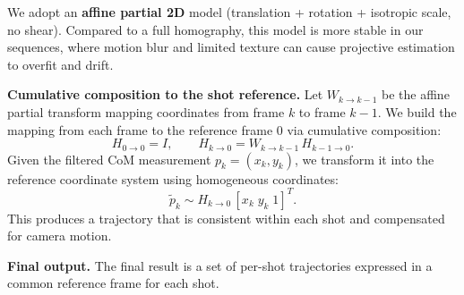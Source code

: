 We adopt an \textbf{affine partial 2D} model (translation + rotation + isotropic scale, no shear). Compared to a full homography, this model is more stable in our sequences, where motion blur and limited texture can cause projective estimation to overfit and drift.

\medskip

\textbf{Cumulative composition to the shot reference.}  
Let $W_{k\rightarrow k-1}$ be the affine partial transform mapping coordinates from frame $k$ to frame $k-1$. We build the mapping from each frame to the reference frame $0$ via cumulative composition:
\[
H_{0\rightarrow 0} = I, \qquad
H_{k\rightarrow 0} = W_{k\rightarrow k-1}\, H_{k-1\rightarrow 0}.
\]
Given the filtered CoM measurement $p_k = (x_k, y_k)$, we transform it into the reference coordinate system using homogeneous coordinates:
\[
\tilde{p}_k \sim H_{k\rightarrow 0}\,[x_k \; y_k \; 1]^T.
\]
This produces a trajectory that is consistent within each shot and compensated for camera motion.

\medskip

\textbf{Final output.}  
The final result is a set of per-shot trajectories expressed in a common reference frame for each shot.
